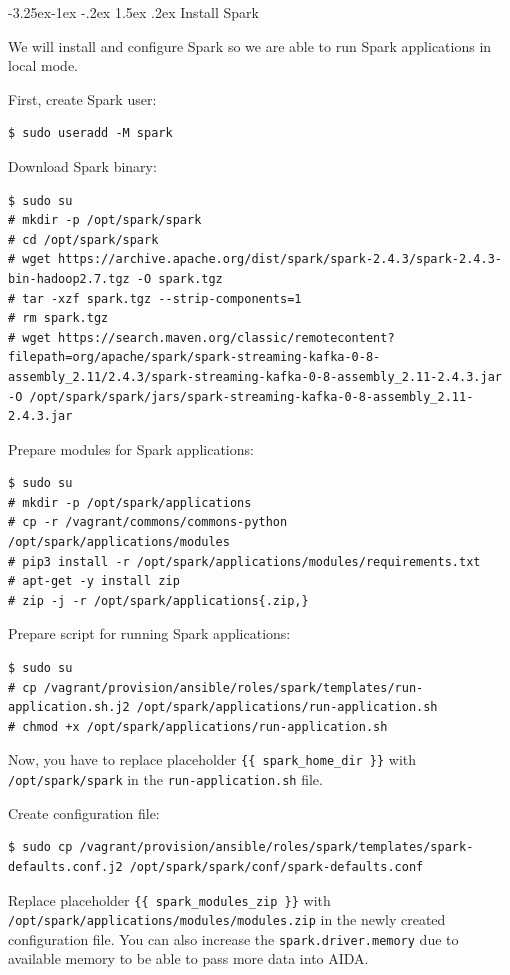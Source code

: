 \documentclass[a4paper]{article} %
\makeatletter
\renewcommand{\normalsize}{\fontsize{12}{15}\selectfont\color{textcolor}}
\renewcommand\subsubsection{\@startsection{subsubsection}{3}{\z@}%
                   {-3.25ex\@plus -1ex \@minus -.2ex}%
                   {1.5ex \@plus .2ex}%
                   {\normalfont\sffamily\normalsize\bfseries\color{projectcolor}}}
\makeatother
\begin{document}
\subsubsection{Install Spark}

We will install and configure Spark so we are able to run Spark applications in local mode.

First, create Spark user:
\begin{lstlisting}
$ sudo useradd -M spark
\end{lstlisting}

Download Spark binary:
\begin{lstlisting}
$ sudo su
# mkdir -p /opt/spark/spark
# cd /opt/spark/spark
# wget https://archive.apache.org/dist/spark/spark-2.4.3/spark-2.4.3-bin-hadoop2.7.tgz -O spark.tgz
# tar -xzf spark.tgz --strip-components=1
# rm spark.tgz
# wget https://search.maven.org/classic/remotecontent?filepath=org/apache/spark/spark-streaming-kafka-0-8-assembly_2.11/2.4.3/spark-streaming-kafka-0-8-assembly_2.11-2.4.3.jar -O /opt/spark/spark/jars/spark-streaming-kafka-0-8-assembly_2.11-2.4.3.jar
\end{lstlisting}

Prepare modules for Spark applications:
\begin{lstlisting}
$ sudo su
# mkdir -p /opt/spark/applications
# cp -r /vagrant/commons/commons-python /opt/spark/applications/modules
# pip3 install -r /opt/spark/applications/modules/requirements.txt
# apt-get -y install zip
# zip -j -r /opt/spark/applications{.zip,}
\end{lstlisting}

Prepare script for running Spark applications:
\begin{lstlisting}
$ sudo su
# cp /vagrant/provision/ansible/roles/spark/templates/run-application.sh.j2 /opt/spark/applications/run-application.sh
# chmod +x /opt/spark/applications/run-application.sh
\end{lstlisting}

Now, you have to replace placeholder \texttt{\{\{ spark\_home\_dir \}\}} with \texttt{/opt/spark/spark} in the \texttt{run-application.sh} file.

Create configuration file:
\begin{lstlisting}
$ sudo cp /vagrant/provision/ansible/roles/spark/templates/spark-defaults.conf.j2 /opt/spark/spark/conf/spark-defaults.conf
\end{lstlisting}

Replace placeholder \texttt{\{\{ spark\_modules\_zip \}\}} with \texttt{/opt/spark/applications/modules/modules.zip} in the newly created configuration file. You can also increase the \texttt{spark.driver.memory} due to available memory to be able to pass more data into AIDA.
\end{document}
